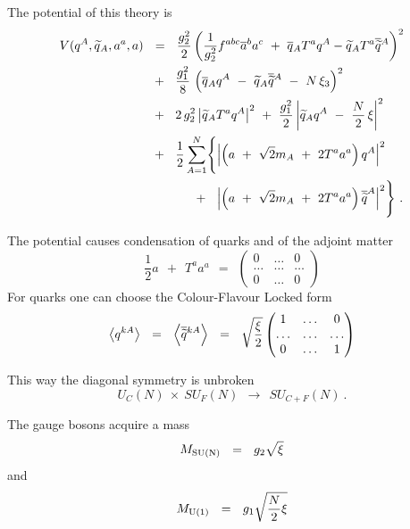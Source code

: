 \documentclass[12pt,letterpaper,landscape,KOMA,smallheadings,calcdimensions,display]{powersem}
\begin{document}
\begin{slide}
	The potential of this theory is
\begin{align*}
%
	V(q^A,\wt{q}{}_A,a^a,a) &~~=~~
			\frac{g_2^2}{2} \left( \frac{1}{g_2^2}f^{abc}\ov{a}{}^b a^c  ~+~
						\ov{q}{}_A T^a q^A  - \wt{q}{}_A T^a \ov{\wt{q}}{}^A \right)^2 \\
%
	& ~~+~~ \frac{g_1^2}{8}\, \left(\ov{q}{}_A q^A ~-~ \wt{q}{}_A\ov{\wt{q}}{}^A ~-~ N\,\xi_3 \right)^2 \\
%
	& ~~+~~ 2\,g_2^2 \left| \wt{q}{}_A T^a q^A \right|^2 ~+~
		\frac{g_1^2}{2} \left| \wt{q}_A q^A ~-~ \frac{N}{2}\, \xi \right|^2 \\
%
	& ~~+~~ \frac{1}{2} \sum_{A=1}^N \Biggl\{ \left|\left(a ~+~ \sqrt{2}m_A ~+~ 2T^a a^a\right)q^A\right|^2 \\
%	
	& \phantom{\frac{1}{2}\sum_{A=1}^N \Biggl\{ } ~~+~~
		\left| \left( a ~+~ \sqrt{2}m_A ~+~ 2T^a a^a\right) \ov{\wt{q}}^A \right|^2 \Biggr\}~.
\end{align*}

\end{slide}


\begin{slide}

	The potential causes condensation of quarks and of the adjoint matter
\[
	\frac{1}{2}a ~~+~~ T^a a^a  ~~=~~ \begin{pmatrix}
					  	0 & \ldots & 0 \\
						\ldots & \ldots & \ldots \\
						0 & \ldots & 0 
					  \end{pmatrix}
\]
	For quarks one can choose the Colour-Flavour Locked form
\[
	\left\langle q^{kA} \right\rangle ~~=~~ \left\langle \overline{\widetilde{q}}{}^{kA} \right\rangle ~~=~~ 
			\sqrt{\frac{\xi}{2}} \begin{pmatrix}
					     	1  & \ldots  & 0 \\
						\ldots & \ldots & \ldots \\
						0 & \ldots &  1
					     \end{pmatrix}
\]
\end{slide}

\begin{slide}
\vspace*{\fill}
	This way the diagonal symmetry is unbroken
\[
	U_C(N) ~\times~ SU_F(N)  ~~\to~~ SU_{C+F}(N)~.
\]

	The gauge bosons acquire a mass
\[
	M_{\rm SU(N)} ~~=~~ g_2 \sqrt{\xi}
\]
	and
\[
	M_{\rm U(1)} ~~=~~ g_1 \sqrt{\frac{N}{2}\xi}
\]
\vspace*{\fill}
\end{slide}
\end{document}
